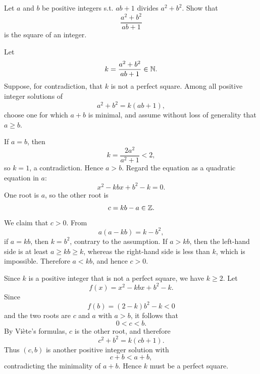 
    \begin{expectedproblem}
        Let $a$ and $b$ be positive integers s.t. $ab+1$ divides
        $a^2+b^2$. Show that
        \[
            \frac{a^2+b^2}{ab+1}
        \]
        is the square of an integer.
    \end{expectedproblem}

    \begin{solution}
        Let
        \[
            k=\frac{a^2+b^2}{ab+1}\in\mathbb{N}.
        \]
        Suppose, for contradiction, that $k$ is not a perfect square. Among all
        positive integer solutions of
        \[
            a^2+b^2=k(ab+1),
        \]
        choose one for which $a+b$ is minimal, and assume without loss of
        generality that $a\geq b$.

        If $a=b$, then
        \[
            k=\frac{2a^2}{a^2+1}<2,
        \]
        so $k=1$, a contradiction. Hence $a>b$. Regard the equation as a
        quadratic equation in $a$:
        \[
            x^2-kbx+b^2-k=0.
        \]
        One root is $a$, so the other root is
        \[
            c=kb-a\in\mathbb{Z}.
        \]
        We claim that $c>0$. From
        \[
            a(a-kb)=k-b^2,
        \]
        if $a=kb$, then $k=b^2$, contrary to the assumption. If $a>kb$, then
        the left-hand side is at least $a\geq kb\geq k$, whereas the
        right-hand side is less than $k$, which is impossible. Therefore
        $a<kb$, and hence $c>0$.

        Since $k$ is a positive integer that is not a perfect square, we have
        $k\geq2$. Let
        \[
            f(x)=x^2-kbx+b^2-k.
        \]
        Since
        \[
            f(b)=(2-k)b^2-k<0
        \]
        and the two roots are $c$ and $a$ with $a>b$, it follows that
        \[
            0<c<b.
        \]
        By Vi\`ete's formulas, $c$ is the other root, and therefore
        \[
            c^2+b^2=k(cb+1).
        \]
        Thus $(c,b)$ is another positive integer solution with
        \[
            c+b<a+b,
        \]
        contradicting the minimality of $a+b$. Hence $k$ must be a perfect
        square.
    \end{solution}

